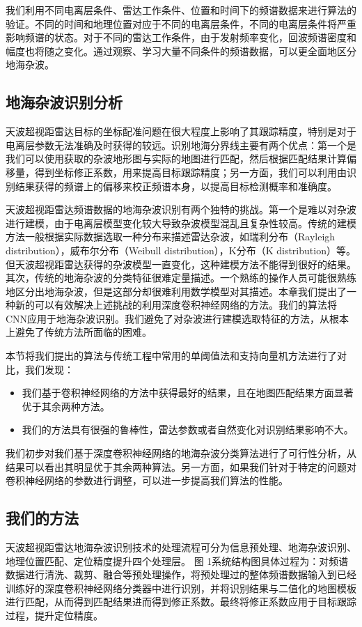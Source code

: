 我们利用不同电离层条件、雷达工作条件、位置和时间下的频谱数据来进行算法的验证。不同的时间和地理位置对应于不同的电离层条件，不同的电离层条件将严重影响频谱的状态。对于不同的雷达工作条件，由于发射频率变化，回波频谱密度和幅度也将随之变化。通过观察、学习大量不同条件的频谱数据，可以更全面地区分地海杂波。

\subsection{地海杂波识别分析}
天波超视距雷达目标的坐标配准问题在很大程度上影响了其跟踪精度，特别是对于电离层参数无法准确及时获得的较远。识别地海分界线主要有两个优点：第一个是我们可以使用获取的杂波地形图与实际的地图进行匹配，然后根据匹配结果计算偏移量，得到坐标修正系数，用来提高目标跟踪精度；另一方面，我们可以利用由识别结果获得的频谱上的偏移来校正频谱本身，以提高目标检测概率和准确度。

天波超视距雷达频谱数据的地海杂波识别有两个独特的挑战。第一个是难以对杂波进行建模，由于电离层模型变化较大导致杂波模型混乱且复杂性较高。传统的建模方法一般根据实际数据选取一种分布来描述雷达杂波，如瑞利分布（Rayleigh distribution），威布尔分布（Weibull distribution），K分布（K distribution）等。但天波超视距雷达获得的杂波模型一直变化，这种建模方法不能得到很好的结果。其次，传统的地海杂波的分类特征很难定量描述。一个熟练的操作人员可能很熟练地区分出地海杂波，但是这部分却很难利用数学模型对其描述。本章我们提出了一种新的可以有效解决上述挑战的利用深度卷积神经网络的方法。我们的算法将CNN应用于地海杂波识别。我们避免了对杂波进行建模选取特征的方法，从根本上避免了传统方法所面临的困难。

本节将我们提出的算法与传统工程中常用的单阈值法和支持向量机方法进行了对比，我们发现：
\begin{itemize}
	\item 我们基于卷积神经网络的方法中获得最好的结果，且在地图匹配结果方面显著优于其余两种方法。
	\item 我们的方法具有很强的鲁棒性，雷达参数或者自然变化对识别结果影响不大。
\end{itemize}
我们初步对我们基于深度卷积神经网络的地海杂波分类算法进行了可行性分析，从结果可以看出其明显优于其余两种算法。另一方面，如果我们针对于特定的问题对卷积神经网络的参数进行调整，可以进一步提高我们算法的性能。
\subsection{我们的方法}
天波超视距雷达地海杂波识别技术的处理流程可分为信息预处理、地海杂波识别、地理位置匹配、定位精度提升四个处理层。 图 1系统结构图具体过程为：对频谱数据进行清洗、裁剪、融合等预处理操作，将预处理过的整体频谱数据输入到已经训练好的深度卷积神经网络分类器中进行识别，并将识别结果与二值化的地图模板进行匹配，从而得到匹配结果进而得到修正系数。最终将修正系数应用于目标跟踪过程，提升定位精度。

